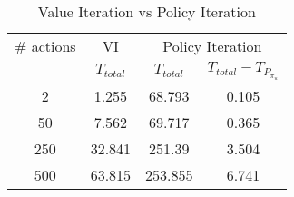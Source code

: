 \begin{table}
\centering
\caption{Value Iteration vs Policy Iteration}
\label{tab:v_vs_p}
\begin{tabular}{|c| c| c| c|}
\hline
\# actions & VI & \multicolumn{2}{|c|}{Policy Iteration} \\ \cline{3-4}
 &  $T_{total} $ & $T_{total}$ & $T_{total} - T_{P_{\pi_u}}$ \\ \hline
2 & 1.255  & 68.793  & 0.105 \\ \hline
50 &  7.562 &  69.717 & 0.365 \\ \hline
250 & 32.841 &  251.39 & 3.504 \\ \hline
500 & 63.815 &  253.855 & 6.741 \\
\hline
\end{tabular}
\end{table}